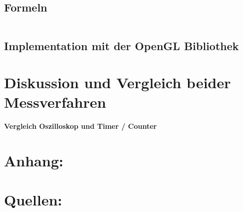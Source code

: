 \documentclass[footsepline,11pt,oneside,a4paper]{scrartcl}
\begin{document}
\par
\subsection{Formeln}
\newline
\begin{center}
\large\underline{ }
\end{center}
\newline
\newline
\newline
\newline

\begin{displaymath}

\end{displaymath}
\newline
\newline

\newline
\newpage

\subsection{Implementation mit der OpenGL Bibliothek}
\newline



\newpage
\section{Diskussion und Vergleich beider Messverfahren}
\begin{center}
\textbf{Vergleich Oszilloskop und Timer / Counter }
\end{center}
\newline
\newline


\newline
\newpage
\section{Anhang:}

\newpage
\section{Quellen:}
\end{document}
